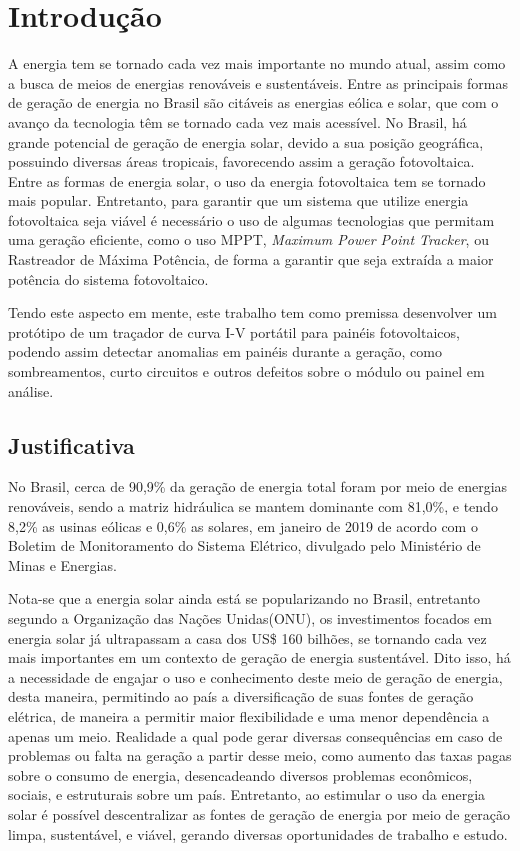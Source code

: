 \chapter{Introdução}
\label{cap:01}
A energia tem se tornado cada vez mais importante no mundo atual, assim como a busca de meios de energias renováveis e sustentáveis. Entre as principais formas de geração de energia no Brasil são citáveis as energias eólica e solar, que com o avanço da tecnologia têm se tornado cada vez mais acessível. No Brasil, há grande potencial de geração de energia solar, devido a sua posição geográfica, possuindo diversas áreas tropicais, favorecendo assim a geração fotovoltaica. Entre as formas de energia solar, o uso da energia fotovoltaica tem se tornado mais popular. Entretanto, para garantir que um sistema que utilize energia fotovoltaica seja viável é necessário o uso de algumas tecnologias que permitam uma geração eficiente, como o uso MPPT, \textit{Maximum Power Point Tracker}, ou Rastreador de Máxima Potência, de forma a garantir que seja extraída a maior potência do sistema fotovoltaico.

\indent		Tendo este aspecto em mente, este trabalho tem como premissa desenvolver um protótipo de um traçador de curva I-V portátil para painéis fotovoltaicos, podendo assim detectar anomalias em painéis durante a geração, como sombreamentos, curto circuitos e outros defeitos sobre o módulo ou painel em análise. 


\section{Justificativa}

No Brasil, cerca de 90,9\% da geração de energia total foram por meio de energias renováveis, sendo a matriz hidráulica se mantem dominante com 81,0\%, e tendo 8,2\% as usinas eólicas e 0,6\% as solares, em janeiro de 2019 de acordo com o Boletim de Monitoramento do Sistema Elétrico, divulgado pelo Ministério de Minas e Energias.%

\indent	Nota-se que a energia solar ainda está se popularizando no Brasil, entretanto segundo a Organização das Nações Unidas(ONU), os investimentos focados em energia solar já ultrapassam a casa dos US\$ 160 bilhões, se tornando cada vez mais importantes em um contexto de geração de energia sustentável. Dito isso, há a necessidade de engajar o uso e conhecimento deste meio de geração de energia, desta maneira, permitindo ao país a diversificação de suas fontes de geração elétrica, de maneira a permitir maior flexibilidade e uma menor dependência a apenas um meio.
Realidade a qual pode gerar diversas consequências em caso de problemas ou falta na geração a partir desse meio, como aumento das taxas pagas sobre o consumo de energia, desencadeando diversos problemas econômicos, sociais, e estruturais sobre um país. Entretanto, ao estimular o uso da energia solar é possível descentralizar as fontes de geração de energia por meio de geração limpa, sustentável, e viável, gerando diversas oportunidades de trabalho e estudo.%



